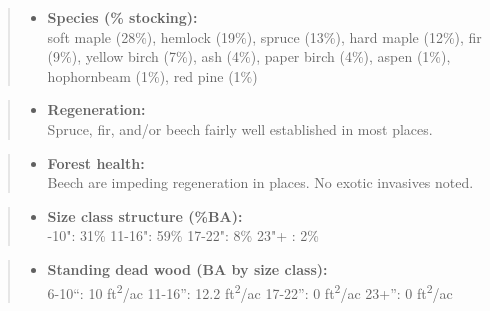 \documentclass[]{tufte-handout}
\providecommand{\tightlist}{%
  \setlength{\itemsep}{0pt}\setlength{\parskip}{0pt}}
\begin{document}
\begin{quote}
\begin{itemize}
\tightlist
\item
  \textbf{Species (\% stocking):}\\
  \vspace{2pt} soft maple (28\%), hemlock (19\%), spruce (13\%), hard
  maple (12\%), fir (9\%), yellow birch (7\%), ash (4\%), paper birch
  (4\%), aspen (1\%), hophornbeam (1\%), red pine (1\%)
\end{itemize}
\end{quote}

\begin{quote}
\begin{itemize}
\tightlist
\item
  \textbf{Regeneration:}\\
  \vspace{2pt} Spruce, fir, and/or beech fairly well established in most
  places.
\end{itemize}
\end{quote}

\begin{quote}
\begin{itemize}
\tightlist
\item
  \textbf{Forest health:}\\
  \vspace{2pt} Beech are impeding regeneration in places. No exotic
  invasives noted.
\end{itemize}
\end{quote}

\begin{quote}
\begin{itemize}
\tightlist
\item
  \textbf{Size class structure (\%BA):}\\
  \vspace{2pt} -10": 31\% \textbar{} 11-16": 59\% \textbar{}
  17-22": 8\% \textbar{} 23"+ : 2\%
\end{itemize}
\end{quote}

\begin{quote}
\begin{itemize}
\tightlist
\item
  \textbf{Standing dead wood (BA by size class):}\\
  \vspace{2pt} \indent \small 6-10``: 10 ft\textsuperscript{2}/ac
  \textbar{} 11-16'': 12.2 ft\textsuperscript{2}/ac \textbar{} 17-22'':
  0 ft\textsuperscript{2}/ac \textbar{} 23+'': 0
  ft\textsuperscript{2}/ac
\end{itemize}
\end{quote}
\end{document}

